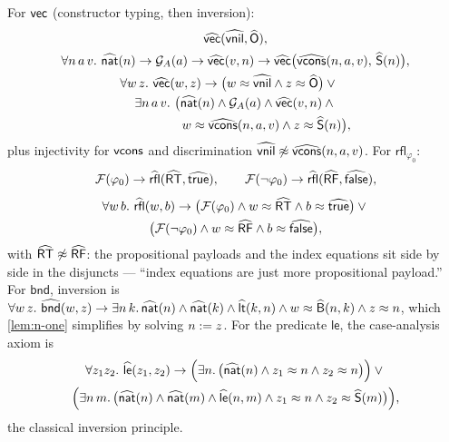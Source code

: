 \begin{example}
\label{ex:running-axioms}
For $\mathsf{vec}$ (constructor typing, then inversion):
\begin{gather*}
  \Ihat{\vect}(\Ihat{\csvnil}, \Ihat{\csO}),\\
  \forall n\,a\,v.\ \Ihat{\nat}(n) \to \guard{A}{a} \to
    \Ihat{\vect}(v, n) \to
    \Ihat{\vect}\bigl(\Ihat{\csvcons}(n,a,v),\, \Ihat{\csS}(n)\bigr),\\
  \begin{multlined}
  \forall w\,z.\ \Ihat{\vect}(w, z) \to
  \bigl(w \feq \Ihat{\csvnil} \wedge z \feq \Ihat{\csO}\bigr) \vee{}\\
  \exists n\,a\,v.\ \bigl(\Ihat{\nat}(n) \wedge \guard{A}{a} \wedge
    \Ihat{\vect}(v,n) \wedge{}\\
    w \feq \Ihat{\csvcons}(n,a,v) \wedge z \feq \Ihat{\csS}(n)\bigr),
  \end{multlined}
\end{gather*}
plus injectivity for $\mathsf{vcons}$ and discrimination
$\widehat{\mathsf{vnil}} \not\approx \widehat{\mathsf{vcons}}(n,a,v)$.  For
$\mathsf{rfl}_{\varphi_0}$:
\[
  \mathcal{F}(\varphi_0) \to \widehat{\mathsf{rfl}}(\widehat{\mathsf{RT}}, \widehat{\mathsf{true}}),
  \qquad
  \mathcal{F}(\neg\varphi_0) \to \widehat{\mathsf{rfl}}(\widehat{\mathsf{RF}}, \widehat{\mathsf{false}}),
\]
\begin{multline*}
  \forall w\,b.\ \widehat{\mathsf{rfl}}(w, b) \to
  \bigl(\mathcal{F}(\varphi_0) \wedge w \approx \widehat{\mathsf{RT}} \wedge b \approx
  \widehat{\mathsf{true}}\bigr) \vee{}\\
  \bigl(\mathcal{F}(\neg\varphi_0) \wedge w \approx \widehat{\mathsf{RF}} \wedge b \approx
  \widehat{\mathsf{false}}\bigr),
\end{multline*}
with $\widehat{\mathsf{RT}} \not\approx \widehat{\mathsf{RF}}$: the propositional
payloads and the index equations sit side by side in the disjuncts ---
``index equations are just more propositional payload.''  For
$\mathsf{bnd}$, inversion is
$\forall w\,z.\ \Ihat{\mathsf{bnd}}(w,z) \to \exists n\,k.\,
\Ihat{\nat}(n) \wedge \Ihat{\nat}(k) \wedge
\Ihat{\mathsf{lt}}(k,n) \wedge w \feq \Ihat{\wcns{B}}(n,k) \wedge z
\feq n$, which \cref{lem:n-one} simplifies by solving $n \mathrel{:=} z$.
For the predicate $\mathsf{le}$, the case-analysis axiom is
\begin{multline*}
  \forall z_1 z_2.\ \widehat{\mathsf{le}}(z_1,z_2) \to
  \Bigl(\exists n.\,\bigl(\widehat{\mathsf{nat}}(n) \wedge z_1 \approx n \wedge z_2
  \approx n\bigr)\Bigr) \vee{}\\
  \Bigl(\exists n\,m.\,\bigl(\widehat{\mathsf{nat}}(n) \wedge \widehat{\mathsf{nat}}(m)
  \wedge \widehat{\mathsf{le}}(n,m) \wedge z_1 \approx n \wedge z_2 \approx
  \widehat{\mathsf{S}}(m)\bigr)\Bigr),
\end{multline*}
the classical inversion principle.
\end{example}

